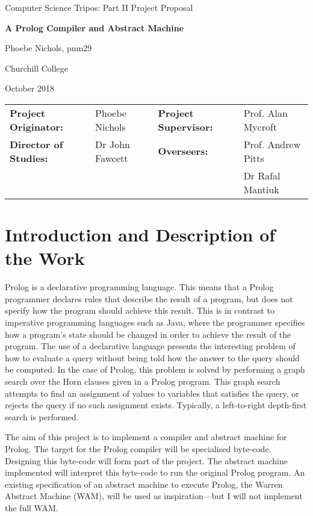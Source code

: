 \documentclass[12pt, a4paper]{article}
\begin{document}


\clearpage
\setcounter{page}{1}



\centerline{\large Computer Science Tripos: Part II Project Proposal}
\vspace{2em}
\centerline{\Large\bf A Prolog Compiler and Abstract Machine}
\vspace{2em}
\centerline{Phoebe Nichols, pmn29}
\centerline{Churchill College}
\centerline{October 2018}

\vspace{2em}

\begin{center}
\begin{tabular}{ l l l l }
{\bf Project Originator:} & Phoebe Nichols & {\bf Project Supervisor:} & Prof. Alan Mycroft \\[3mm]
{\bf Director of Studies:} & Dr John Fawcett & {\bf Overseers:} & Prof. Andrew Pitts \\[3mm]
&&&  Dr Rafal Mantiuk  \\[3mm]
\end{tabular}
\end{center}



\section*{Introduction and Description of the Work}

Prolog is a declarative programming language. This means that a Prolog programmer declares rules that describe the result of a program, but does not specify how the program should achieve this result. This is in contrast to imperative programming languages such as Java, where the programmer specifies how a program's state should be changed in order to achieve the result of the program. The use of a declarative language presents the interesting problem of how to evaluate a query without being told how the answer to the query should be computed. In the case of Prolog, this problem is solved by performing a graph search over the Horn clauses given in a Prolog program. This graph search attempts to find an assignment of values to variables that satisfies the query, or rejects the query if no such assignment exists. Typically, a left-to-right depth-first search is performed.

The aim of this project is to implement a compiler and abstract machine for Prolog. The target for the Prolog compiler will be specialised byte-code. Designing this byte-code will form part of the project. The abstract machine implemented will interpret this byte-code to run the original Prolog program. An existing specification of an abstract machine to execute Prolog, the Warren Abstract Machine (WAM), will be used as inspiration---but I will not implement the full WAM.
\end{document}
